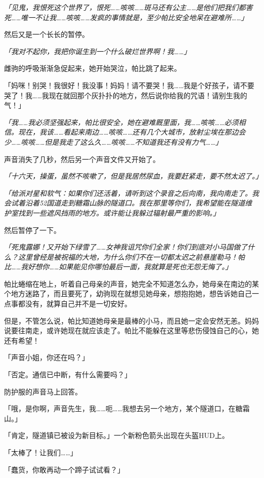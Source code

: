 \emph{「见鬼，我恨死这个世界了，恨死……咳咳……斑马还有公主……是他们把我们都害死……唯一不让我……咳咳……发疯的事情就是，至少帕比安全地呆在避难所……」}

然后又是一个长长的暂停。

\emph{「我对不起你，我把你诞生到一个什么破烂世界啊！我……」}

雌驹的呼吸渐渐急促起来，她开始哭泣，帕比跳了起来。

「妈咪！别哭！我很好！我没事！妈妈！请不要哭！我……我是个好孩子，请不要哭了！我……我现在就回那个灰扑扑的地方，然后说你给我的咒语！请别生我的气！」

\emph{「我……我必须坚强起来，帕比很安全，她在避难厩里面，我……咳咳……必须相信。现在，我该……看起来南边……咳咳……还有几个大城市，放射尘埃在那边会少……咳咳……但是我走了这么久……咳咳……不知道我还有没有力气……」}

声音消失了几秒，然后另一个声音文件又开始了。

\emph{「十六天，操蛋，虽然不咳嗽了，但是我居然尿血，我要赶紧走，要不然太迟了。」}

\emph{「给派对星和软气：如果你们还活着，请听到这个录音之后向南，我向南走了。我会试着沿着52国道走到糖霜山脉的隧道口。我在那里等你们，我希望能在隧道维护室找到一些遮风挡雨的地方。或许能让我躲过辐射最严重的影响。」}

然后暂停了一下。

\emph{「死鬼露娜！又开始下绿雪了……女神我诅咒你们全家！你们到底对小马国做了什么？这里曾经是被祝福的大地，为什么你们不在一切都太迟之前悬崖勒马！帕比……我好想你……如果能见你哪怕最后一面，我就算是死也无怨无悔了。」}

帕比蜷缩在地上，听着自己母亲的声音，她完全不知道怎么办，她母亲在南边的某个地方迷路了，而且要死了，幼驹现在就想见她母亲，想抱抱她，想告诉她自己一点事都没有，就算自己并不是一切安好。

但是，不管怎么说，帕比知道她母亲是最棒的小马，而且她一定会安然无恙。妈妈说要往南走，或许她现在就应该走了。帕比不能躲在这里等悲伤侵蚀自己的心，她还有希望！

「声音小姐，你还在吗？」

「{\mt 否定。通信已中断，有什么需要吗？}」

防护服的声音马上回答。

「哦，是你啊，声音先生，我……呃……我想去另一个地方，某个隧道口，在糖霜山。」

「{\mt 肯定，隧道镇已被设为新目标。}」一个新粉色箭头出现在头盔HUD上。

「太棒了！让我们……」

「蠢货，你敢再动一个蹄子试试看？」

